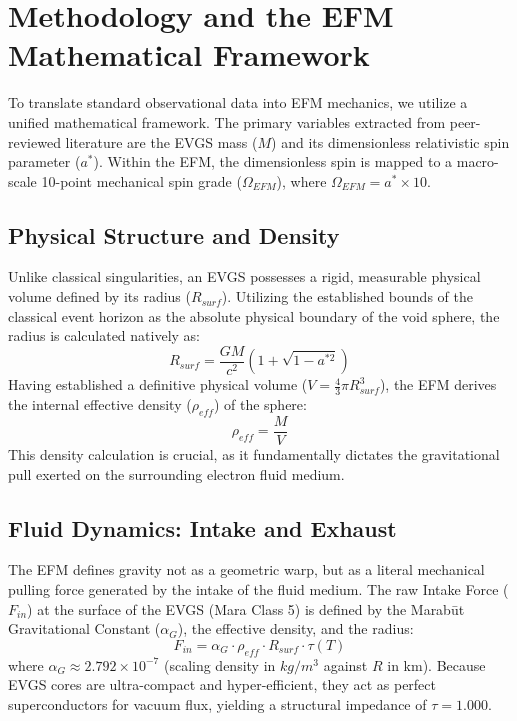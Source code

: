 \documentclass[11pt, a4paper]{article}
\begin{document}
\section{Methodology and the EFM Mathematical Framework}
To translate standard observational data into EFM mechanics, we utilize a unified mathematical framework. The primary variables extracted from peer-reviewed literature are the EVGS mass ($M$) and its dimensionless relativistic spin parameter ($a^*$). Within the EFM, the dimensionless spin is mapped to a macro-scale 10-point mechanical spin grade ($\Omega_{EFM}$), where $\Omega_{EFM} = a^* \times 10$.

\subsection{Physical Structure and Density}
Unlike classical singularities, an EVGS possesses a rigid, measurable physical volume defined by its radius ($R_{surf}$). Utilizing the established bounds of the classical event horizon as the absolute physical boundary of the void sphere, the radius is calculated natively as:
\begin{equation}
  R_{surf} = \frac{GM}{c^2} \left(1 + \sqrt{1 - a^{*2}}\right)
\end{equation}
Having established a definitive physical volume ($V = \frac{4}{3}\pi R_{surf}^3$), the EFM derives the internal effective density ($\rho_{eff}$) of the sphere:
\begin{equation}
  \rho_{eff} = \frac{M}{V}
\end{equation}
This density calculation is crucial, as it fundamentally dictates the gravitational pull exerted on the surrounding electron fluid medium.

\subsection{Fluid Dynamics: Intake and Exhaust}
The EFM defines gravity not as a geometric warp, but as a literal mechanical pulling force generated by the intake of the fluid medium. The raw Intake Force ($F_{in}$) at the surface of the EVGS (Mara Class 5) is defined by the Marab\={u}t Gravitational Constant ($\alpha_G$), the effective density, and the radius:
\begin{equation}
  F_{in} = \alpha_G \cdot \rho_{eff} \cdot R_{surf} \cdot \tau(T)
\end{equation}
where $\alpha_G \approx 2.792 \times 10^{-7}$ (scaling density in $kg/m^3$ against $R$ in km). Because EVGS cores are ultra-compact and hyper-efficient, they act as perfect superconductors for vacuum flux, yielding a structural impedance of $\tau = 1.000$.
\end{document}
